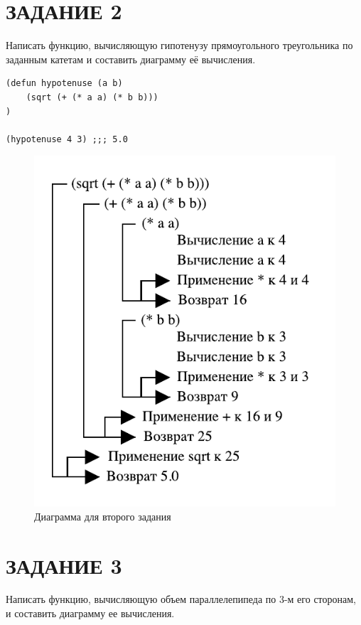 \chapter{ЗАДАНИЕ 2}

Написать функцию, вычисляющую гипотенузу прямоугольного
треугольника по заданным катетам и составить диаграмму её вычисления.

\begin{lstlisting}
(defun hypotenuse (a b)
    (sqrt (+ (* a a) (* b b)))
)

(hypotenuse 4 3) ;;; 5.0
\end{lstlisting}

\begin{figure}[H]
    \centering
    \includegraphics{img/02.pdf}
    \caption{Диаграмма для второго задания}
\end{figure}

\chapter{ЗАДАНИЕ 3}

Написать функцию, вычисляющую объем параллелепипеда
по 3-м его сторонам, и составить диаграмму ее вычисления.

